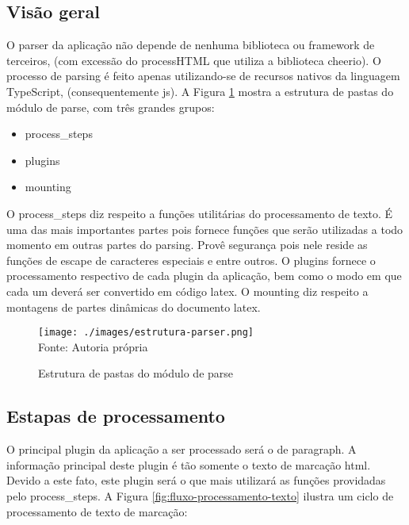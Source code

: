 \subsection{Visão geral}

O parser da aplicação não depende de nenhuma biblioteca
ou framework de terceiros,
(com excessão do processHTML que utiliza a biblioteca cheerio).
O processo de parsing é feito
apenas utilizando-se de recursos nativos da linguagem
TypeScript, (consequentemente
\acrshort{js}).
A
Figura \ref{fig:estrutura-parser}
mostra a estrutura de pastas do módulo de parse, com três grandes
grupos:

\begin{itemize}
        
	\item process\_steps
	\item plugins
	\item mounting
    
\end{itemize}

O process\_steps diz respeito a funções utilitárias do processamento de texto.
É uma das mais importantes partes pois fornece funções que serão utilizadas a todo
momento em outras partes do parsing. Provê segurança pois nele reside as funções
de escape de caracteres especiais e entre outros.
O plugins fornece o processamento respectivo de cada plugin da aplicação,
bem como o modo em que cada um deverá ser convertido em código
\acrshort{latex}.
O mounting diz respeito a montagens de partes dinâmicas do documento
\acrshort{latex}.

\begin{figure}[H]
    \centering
    \caption{Estrutura de pastas do módulo de parse}
    \texttt{[image: ./images/estrutura-parser.png]}
    \label{fig:estrutura-parser} \\
    \textnormal{\fontsize{10pt}{12pt}Fonte: Autoria própria}
\end{figure}

\subsection{Estapas de processamento}

O principal plugin da aplicação a ser processado será o de paragraph.
A informação principal deste plugin é tão somente o texto de marcação
\acrshort{html}. Devido a este fato, este plugin
será o que mais utilizará as funções providadas pelo process\_steps.
A
Figura \ref{fig:fluxo-processamento-texto}
ilustra um ciclo de processamento de texto de marcação:

